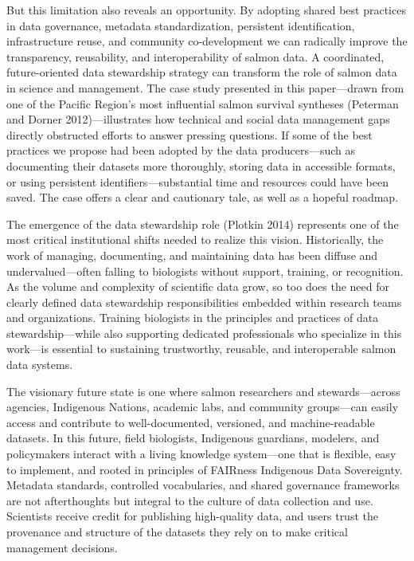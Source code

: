 \documentclass[
  letterpaper,
  DIV=11,
  numbers=noendperiod]{scrartcl}
\begin{document}
But this limitation also reveals an opportunity. By adopting shared best
practices in data governance, metadata standardization, persistent
identification, infrastructure reuse, and community co-development we
can radically improve the transparency, reusability, and
interoperability of salmon data. A coordinated, future-oriented data
stewardship strategy can transform the role of salmon data in science
and management. The case study presented in this paper---drawn from one
of the Pacific Region's most influential salmon survival syntheses
(Peterman and Dorner 2012)---illustrates how technical and social data
management gaps directly obstructed efforts to answer pressing
questions. If some of the best practices we propose had been adopted by
the data producers---such as documenting their datasets more thoroughly,
storing data in accessible formats, or using persistent
identifiers---substantial time and resources could have been saved. The
case offers a clear and cautionary tale, as well as a hopeful roadmap.

The emergence of the data stewardship role (Plotkin 2014) represents one
of the most critical institutional shifts needed to realize this vision.
Historically, the work of managing, documenting, and maintaining data
has been diffuse and undervalued---often falling to biologists without
support, training, or recognition. As the volume and complexity of
scientific data grow, so too does the need for clearly defined data
stewardship responsibilities embedded within research teams and
organizations. Training biologists in the principles and practices of
data stewardship---while also supporting dedicated professionals who
specialize in this work---is essential to sustaining trustworthy,
reusable, and interoperable salmon data systems.

The visionary future state is one where salmon researchers and
stewards---across agencies, Indigenous Nations, academic labs, and
community groups---can easily access and contribute to well-documented,
versioned, and machine-readable datasets. In this future, field
biologists, Indigenous guardians, modelers, and policymakers interact
with a living knowledge system---one that is flexible, easy to
implement, and rooted in principles of FAIRness Indigenous Data
Sovereignty. Metadata standards, controlled vocabularies, and shared
governance frameworks are not afterthoughts but integral to the culture
of data collection and use. Scientists receive credit for publishing
high-quality data, and users trust the provenance and structure of the
datasets they rely on to make critical management decisions.
\end{document}
